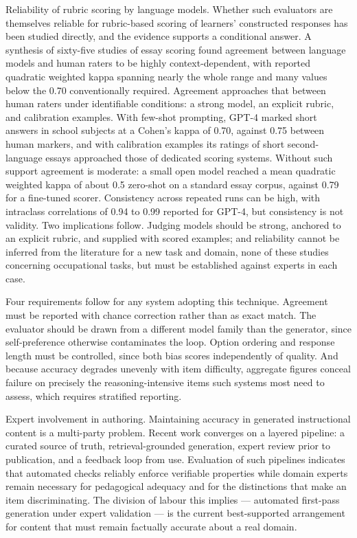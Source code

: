 Reliability of rubric scoring by language models. Whether such evaluators are themselves reliable for rubric-\allowbreak{}based scoring of learners' constructed responses has been studied directly, and the evidence supports a conditional answer. A synthesis of sixty-five studies of essay scoring found agreement between language models and human raters to be highly context-\allowbreak{}dependent, with reported quadratic weighted kappa spanning nearly the whole range and many values below the 0.70 conventionally required\cite{r101}. Agreement approaches that between human raters under identifiable conditions: a strong model, an explicit rubric, and calibration examples. With few-shot prompting, GPT-4 marked short answers in school subjects at a Cohen's kappa of 0.70, against 0.75 between human markers\cite{r102}, and with calibration examples its ratings of short second-\allowbreak{}language essays approached those of dedicated scoring systems\cite{r103}. Without such support agreement is moderate: a small open model reached a mean quadratic weighted kappa of about 0.5 zero-shot on a standard essay corpus, against 0.79 for a fine-tuned scorer\cite{r104}. Consistency across repeated runs can be high, with intraclass correlations of 0.94 to 0.99 reported for GPT-4\cite{r105}, but consistency is not validity. Two implications follow. Judging models should be strong, anchored to an explicit rubric, and supplied with scored examples; and reliability cannot be inferred from the literature for a new task and domain, none of these studies concerning occupational tasks, but must be established against experts in each case.

Four requirements follow for any system adopting this technique. Agreement must be reported with chance correction rather than as exact match. The evaluator should be drawn from a different model family than the generator, since self-\allowbreak{}preference otherwise contaminates the loop. Option ordering and response length must be controlled, since both bias scores independently of quality. And because accuracy degrades unevenly with item difficulty, aggregate figures conceal failure on precisely the reasoning-\allowbreak{}intensive items such systems most need to assess, which requires stratified reporting.

Expert involvement in authoring. Maintaining accuracy in generated instructional content is a multi-party problem. Recent work converges on a layered pipeline: a curated source of truth, retrieval-\allowbreak{}grounded generation, expert review prior to publication, and a feedback loop from use. Evaluation of such pipelines indicates that automated checks reliably enforce verifiable properties while domain experts remain necessary for pedagogical adequacy and for the distinctions that make an item discriminating\cite{r61}. The division of labour this implies --- automated first-pass generation under expert validation --- is the current best-\allowbreak{}supported arrangement for content that must remain factually accurate about a real domain.

